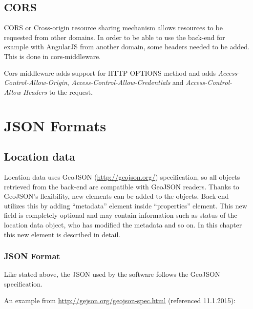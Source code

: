 \documentclass[letterpaper,10pt,english]{sphinxmanual}
\begin{document}
\section{CORS}
\label{headersandcors:cors}
CORS or Cross-origin resource sharing mechanism allows resources to be requested from other domains. In order to be able to
use the back-end for example with AngularJS from another domain, some headers needed to be added. This is done in cors-middleware.

Cors middleware adds support for HTTP OPTIONS method and adds \emph{Access-Control-Allow-Origin}, \emph{Access-Control-Allow-Credentials} and
\emph{Access-Control-Allow-Headers} to the request.


\chapter{JSON Formats}
\label{json/jsondoc::doc}\label{json/jsondoc:json-formats}

\section{Location data}
\label{json/locationdatajson:locationjson}\label{json/locationdatajson::doc}\label{json/locationdatajson:location-data}
Location data uses GeoJSON (\href{http://geojson.org/}{http://geojson.org/}) specification, so all objects retrieved from the back-end are compatible
with GeoJSON readers. Thanks to GeoJSON's flexibility, new elements can be added to the objects. Back-end utilizes this
by adding ``metadata'' element inside ``properties'' element. This new field is completely optional and may contain information
such as status of the location data object, who has modified the metadata and so on. In this chapter this new element is
described in detail.


\subsection{JSON Format}
\label{json/locationdatajson:json-format}
Like stated above, the JSON used by the software follows the GeoJSON specification.

An example from \href{http://gejson.org/geojson-spec.html}{http://gejson.org/geojson-spec.html} (referenced 11.1.2015):
\end{document}

